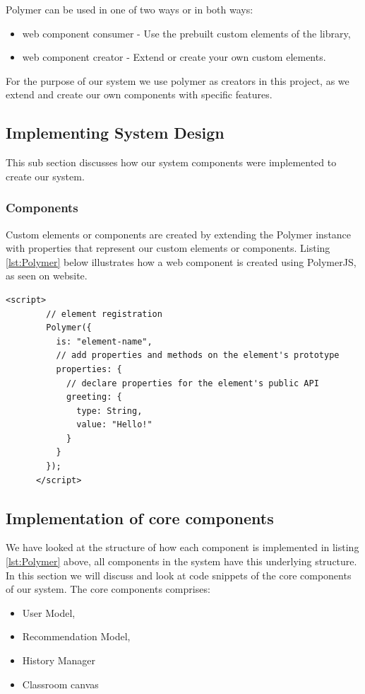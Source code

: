 Polymer can be used in one of two ways or in both ways: 
\begin{itemize}
    \item web component consumer - Use the prebuilt custom elements of the library, 
    \item web component creator - Extend or create your own custom elements.
\end{itemize}

For the purpose of our system we use polymer as creators in this project, as we extend and create our own components with specific features.

\subsection{Implementing System Design}
This sub section discusses how our system components were implemented to create our system.
\subsubsection{Components}
Custom elements or components are created by extending the Polymer instance with properties that represent our custom elements or components. Listing \ref{lst:Polymer} below illustrates how a web component is created using PolymerJS, as seen on \cite{website:PolymerJS} website.
\begin{lstlisting}[caption={Creating a web component with PolymerJS}, label={lst:Polymer}]
    <script>
        // element registration
        Polymer({
          is: "element-name",
          // add properties and methods on the element's prototype
          properties: {
            // declare properties for the element's public API
            greeting: {
              type: String,
              value: "Hello!"
            }
          }
        });
      </script>
\end{lstlisting}

\subsection{Implementation of core components}
We have looked at the structure of how each component is implemented in listing \ref{lst:Polymer} above, all components in the system have this underlying structure. In this section we will discuss and look at code snippets of the core components of our system. The core components comprises: 
\begin{itemize}
    \item User Model,
    \item Recommendation Model,
    \item History Manager
    \item Classroom canvas      
\end{itemize}

